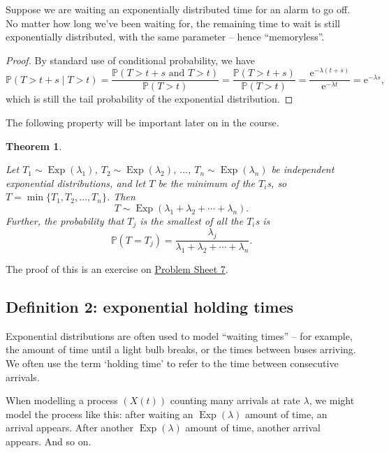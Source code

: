 \documentclass[
  a4paper,
]{article}
\newtheorem{theorem}{Theorem}[section]
\theoremstyle{definition}
\theoremstyle{definition}
\theoremstyle{definition}
\theoremstyle{remark}
\begin{document}
Suppose we are waiting an exponentially distributed time for an alarm to go off. No matter how long we've been waiting for, the remaining time to wait is still exponentially distributed, with the same parameter -- hence ``memoryless''.

\begin{proof}

By standard use of conditional probability, we have
\[ \mathbb P(T > t + s \mid T > t) = \frac{\mathbb P(T > t + s \text{ and } T > t)}{\mathbb P(T > t)} =  \frac{\mathbb P(T > t + s)}{\mathbb P(T > t)} = \frac{\mathrm{e}^{-\lambda(t+s)}}{\mathrm{e}^{-\lambda t}} = \mathrm{e}^{-\lambda s} , \]
which is still the tail probability of the exponential distribution.

\end{proof}

The following property will be important later on in the course.

\begin{theorem}
\protect\hypertarget{thm:exponential-thm}{}\label{thm:exponential-thm}

Let \(T_1 \sim \operatorname{Exp}(\lambda_1)\), \(T_2 \sim \operatorname{Exp}(\lambda_2)\), \(\dots\), \(T_n \sim \operatorname{Exp}(\lambda_n)\) be independent exponential distributions, and let \(T\) be the minimum of the \(T_i\)s, so \(T = \min\{T_1, T_2, \dots, T_n \}\). Then
\[ T \sim \operatorname{Exp}(\lambda_1 + \lambda_2 + \cdots + \lambda_n) . \]
Further, the probability that \(T_j\) is the smallest of all the \(T_i\)s is
\[ \mathbb P(T = T_j) = \frac{\lambda_j}{\lambda_1 + \lambda_2 + \cdots + \lambda_n} . \]

\end{theorem}

The proof of this is an exercise on \protect\hyperlink{P07}{Problem Sheet 7}.

\hypertarget{definition-2-exponential-holding-times}{%
\subsection{Definition 2: exponential holding times}\label{definition-2-exponential-holding-times}}

Exponential distributions are often used to model ``waiting times'' -- for example, the amount of time until a light bulb breaks, or the times between buses arriving. We often use the term `holding time' to refer to the time between consecutive arrivals.

When modelling a process \((X(t))\) counting many arrivals at rate \(\lambda\), we might model the process like this: after waiting an \(\operatorname{Exp}(\lambda)\) amount of time, an arrival appears. After another \(\operatorname{Exp}(\lambda)\) amount of time, another arrival appears. And so on.
\end{document}
